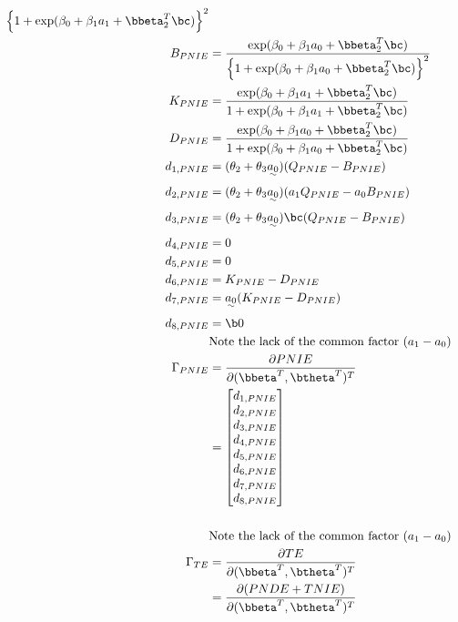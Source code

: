 \documentclass[dvipdfmx,10pt]{article}
\begin{document}
\begin{align*}
      {\left\{ 1 + \exp(\beta_{0} + \beta_{1}a_{1} + \bbeta_{2}^{T}\bc) \right\}^{2}}\\
  B_{PNIE} &= \frac
      {            \exp(\beta_{0} + \beta_{1}a_{0} + \bbeta_{2}^{T}\bc)}
      {\left\{ 1 + \exp(\beta_{0} + \beta_{1}a_{0} + \bbeta_{2}^{T}\bc) \right\}^{2}}\\
  K_{PNIE} &= \frac
      {    \exp(\beta_{0} + \beta_{1}a_{1} + \bbeta_{2}^{T}\bc)}
      {1 + \exp(\beta_{0} + \beta_{1}a_{1} + \bbeta_{2}^{T}\bc)}\\
  D_{PNIE} &= \frac
      {    \exp(\beta_{0} + \beta_{1}a_{0} + \bbeta_{2}^{T}\bc)}
      {1 + \exp(\beta_{0} + \beta_{1}a_{0} + \bbeta_{2}^{T}\bc)}\\
  d_{1,PNIE} &= (\theta_{2} + \theta_{3}\uwave{a_{0}}) (Q_{PNIE} - B_{PNIE})\\
  d_{2,PNIE} &= (\theta_{2} + \theta_{3}\uwave{a_{0}}) (a_{1}Q_{PNIE} - a_{0}B_{PNIE})\\
  d_{3,PNIE} &= (\theta_{2} + \theta_{3}\uwave{a_{0}})\bc (Q_{PNIE} - B_{PNIE})\\
  d_{4,PNIE} &= 0\\
  d_{5,PNIE} &= 0\\
  d_{6,PNIE} &= K_{PNIE} - D_{PNIE}\\
  d_{7,PNIE} &= \uwave{a_{0}} (K_{PNIE} - D_{PNIE})\\
  d_{8,PNIE} &= \b0\\
  &\text{Note the lack of the common factor }(a_{1} - a_{0})\\
  \Gamma_{PNIE}
  &= \frac{\partial PNIE}{\partial (\bbeta^{T},\btheta^{T})^{T}}\\
  &= \begin{bmatrix}
      d_{1,PNIE}\\
      d_{2,PNIE}\\
      d_{3,PNIE}\\
      d_{4,PNIE}\\
      d_{5,PNIE}\\
      d_{6,PNIE}\\
      d_{7,PNIE}\\
      d_{8,PNIE}\\
    \end{bmatrix}\\
  \\
  &\text{Note the lack of the common factor }(a_{1} - a_{0})\\
  \Gamma_{TE}
  &= \frac{\partial TE}{\partial (\bbeta^{T},\btheta^{T})^{T}}\\
  &= \frac{\partial (PNDE+TNIE)}{\partial (\bbeta^{T},\btheta^{T})^{T}}\\

\end{align*}
\end{document}

